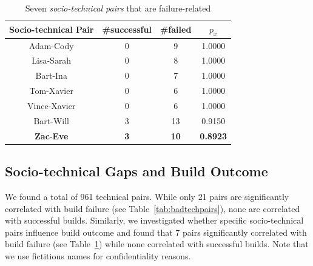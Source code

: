 \documentclass{sig-alternate}
\begin{document}
\begin{table}[t]
\centering
\begin{tabular}{cccc}
\toprule
Socio-technical Pair & \#successful & \#failed & $p_x$\\
\midrule
Adam-Cody & 0 & \phantom{1}9 & 1.0000 \\
Lisa-Sarah & 0 & \phantom{1}8 & 1.0000 \\
Bart-Ina & 0 & \phantom{1}7 & 1.0000 \\
Tom-Xavier & 0 & \phantom{1}6 & 1.0000 \\
Vince-Xavier & 0 & \phantom{1}6 & 1.0000 \\
Bart-Will & 3 & 13 & 0.9150\\%
\textbf{Zac}-\textbf{Eve} & \textbf{3} & \textbf{10} & \textbf{0.8923}\\%
%
\bottomrule
\end{tabular}
\caption{Seven  \emph{socio-technical pairs} that are failure-related}
\label{tab:badstechpairs}
\end{table}


\subsection{Socio-technical Gaps and Build Outcome}
We found a total of 961 technical pairs. %
While only 21 pairs are significantly correlated with build failure (see
Table~\ref{tab:badtechpairs}), none are correlated with successful builds.
%
Similarly, we investigated whether specific socio-technical pairs influence
build outcome and found that 7 pairs significantly correlated with build
failure (see Table~\ref{tab:badstechpairs}) while none correlated with successful builds.
Note that we use fictitious names for confidentiality reasons.
\end{document}
